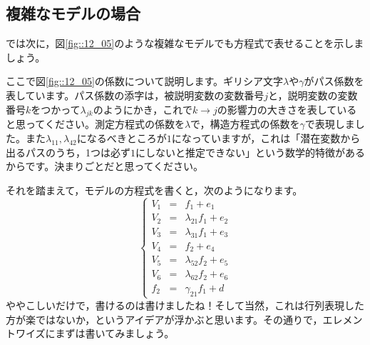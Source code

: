 \documentclass{ltjsbook}
\begin{document}
\subsection{複雑なモデルの場合}

では次に，図\ref{fig::12_05}のような複雑なモデルでも方程式で表せることを示しましょう。

ここで図\ref{fig::12_05}の係数について説明します。ギリシア文字$\lambda$や$\gamma$がパス係数を表しています。パス係数の添字は，被説明変数の変数番号$j$と，説明変数の変数番号$k$をつかって$\lambda_{jk}$のようにかき，これで$k \to j$の影響力の大きさを表していると思ってください。測定方程式の係数を$\lambda$で，構造方程式の係数を$\gamma$で表現しました。また$\lambda_{11},\lambda_{42}$になるべきところが$1$になっていますが，これは「潜在変数から出るパスのうち，1つは必ず$1$にしないと推定できない」という数学的特徴があるからです。決まりごとだと思ってください。

それを踏まえて，モデルの方程式を書くと，次のようになります。
\[ \left \{
    \begin{array}{rcl}
        V_1 & = & f_1 + e_1             \\
        V_2 & = & \lambda_{21}f_1 + e_2 \\
        V_3 & = & \lambda_{31}f_1 + e_3 \\
        V_4 & = & f_2 + e_4             \\
        V_5 & = & \lambda_{52}f_2 + e_5 \\
        V_6 & = & \lambda_{62}f_2 + e_6 \\
        f_2 & = & \gamma_{21}f_1 + d
    \end{array}
    \right .
\]
ややこしいだけで，書けるのは書けましたね！そして当然，これは行列表現した方が楽ではないか，というアイデアが浮かぶと思います。その通りで，エレメントワイズにまずは書いてみましょう。
\end{document}
